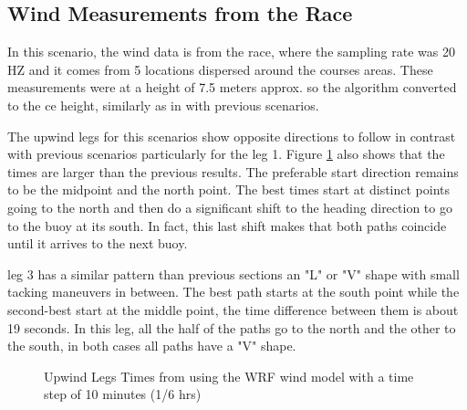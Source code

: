 \subsection{Wind Measurements from the Race}
In this scenario, the wind data is from the race, where the sampling rate was 20 HZ and it comes from  5 locations dispersed around the courses areas. These measurements were at a height of 7.5 meters approx. so the algorithm converted to the \acrshort{ce} height, similarly as in with previous scenarios. \par \noindent
The upwind legs for this scenarios show opposite directions to follow in contrast with previous scenarios particularly for the leg 1. Figure \ref{fig:sap_upwind} also shows that the times are larger than the previous results. The preferable start direction remains to be the midpoint  and  the north point. The best times start at distinct points going to the north and then do a significant shift to the heading direction to go to the buoy at its south. In fact, this last shift makes that both paths coincide until it arrives to the next buoy.\par \noindent  
leg 3 has a similar pattern than previous sections an "L" or "V" shape with small tacking maneuvers in between. The best path starts at the south point while the second-best start at the middle point, the time difference between them is about 19 seconds. In this leg, all the half of the paths go to the north and the other to the south, in both cases all paths have a "V" shape.   \par 

\begin{figure} [hbt!] 
  \centering
  \hfill
  \caption{Upwind Legs Times from using the WRF wind model with a time step of 10 minutes (1/6 hrs)} %
\label{fig:sap_upwind}
\end{figure}

